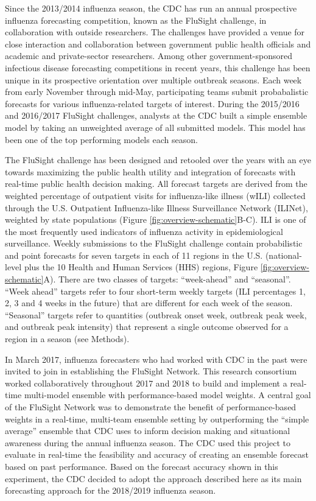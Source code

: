 \documentclass{article}\usepackage[]{graphicx}\usepackage[]{color}
\begin{document}
Since the 2013/2014 influenza season, the CDC has run an annual prospective influenza forecasting competition, known as the FluSight challenge, in collaboration with outside researchers. 
The challenges have provided a venue for close interaction and collaboration between government public health officials and academic and private-sector researchers. 
Among other government-sponsored infectious disease forecasting competitions in recent years,\cite{DARPA2015,NOAA} this challenge has been unique in its prospective orientation over multiple outbreak seasons.
Each week from early November through mid-May, participating teams submit probabalistic forecasts for various influenza-related targets of interest.
During the 2015/2016 and 2016/2017 FluSight challenges, analysts at the CDC built a simple ensemble model by taking an unweighted average of all submitted models. 
This model has been one of the top performing models each season.\cite{McGowan2018}

The FluSight challenge has been designed and retooled over the years with an eye towards maximizing the public health utility and integration of forecasts with real-time public health decision making.
All forecast targets are derived from the weighted percentage of outpatient visits for influenza-like illness (wILI) collected through the U.S. Outpatient Influenza-like Illness Surveillance Network (ILINet), weighted by state populations (Figure \ref{fig:overview-schematic}B-C).
ILI is one of the most frequently used indicators of influenza activity in epidemiological surveillance. 
Weekly submissions to the FluSight challenge contain probabilistic and point forecasts for seven targets in each of 11 regions in the U.S. (national-level plus the 10 Health and Human Services (HHS) regions, Figure \ref{fig:overview-schematic}A).
There are two classes of targets: ``week-ahead'' and ``seasonal''.
``Week ahead'' targets refer to four short-term weekly targets (ILI percentages 1, 2, 3 and 4 weeks in the future) that are different for each week of the season.
``Seasonal'' targets refer to quantities (outbreak onset week, outbreak peak week, and outbreak peak intensity) that represent a single outcome observed for a region in a season (see Methods). 

In March 2017, influenza forecasters who had worked with CDC in the past were invited to join in establishing the FluSight Network.
This research consortium worked collaboratively throughout 2017 and 2018 to build and implement a real-time multi-model ensemble with performance-based model weights.
A central goal of the FluSight Network was to demonstrate the benefit of performance-based weights in a real-time, multi-team ensemble setting by outperforming the ``simple average'' ensemble that CDC uses to inform decision making and situational awareness during the annual influenza season. 
The CDC used this project to evaluate in real-time the feasibility and accuracy of creating an ensemble forecast based on past performance. 
Based on the forecast accuracy shown in this experiment, the CDC decided to adopt the approach described here as its main forecasting approach for the 2018/2019 influenza season. 
\end{document}
